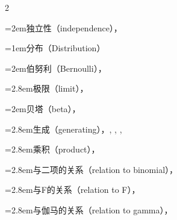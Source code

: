 \begin{multicols}{2}
\par\noindent\hangindent=2em\hspace*{1em}\label{idx:250}独立性（independence），\hyperref[exercise:1.39]{\pageref*{exercise:1.39}}\par
\par\addvspace{2pt}
\par\noindent\hangindent=1em\hspace*{0em}\label{idx:251}分布（Distribution）\par
\par\noindent\hangindent=2em\hspace*{1em}\label{idx:252}伯努利（Bernoulli），\hyperref[eq:3.2.3]{\pageref*{eq:3.2.3}}\par
\par\noindent\hangindent=2.8em\hspace*{1.8em}\label{idx:253}极限（limit），\hyperref[exercise:5.44]{\pageref*{exercise:5.44}}\par
\par\noindent\hangindent=2em\hspace*{1em}\label{idx:254}贝塔（beta），\hyperref[eq:3.3.16]{\pageref*{eq:3.3.16}}\par
\par\noindent\hangindent=2.8em\hspace*{1.8em}\label{idx:255}生成（generating），\hyperref[eq:5.6.5]{\pageref*{eq:5.6.5}}, \hyperref[ex:5.6.7]{\pageref*{ex:5.6.7}}, \hyperref[ex:5.6.9]{\pageref*{ex:5.6.9}}, \hyperref[exercise:5.61]{\pageref*{exercise:5.61}}\par
\par\noindent\hangindent=2.8em\hspace*{1.8em}\label{idx:256}乘积（product），\hyperref[ex:4.3.3]{\pageref*{ex:4.3.3}}\par
\par\noindent\hangindent=2.8em\hspace*{1.8em}\label{idx:257}与二项的关系（relation to binomial），\hyperref[exercise:2.40]{\pageref*{exercise:2.40}}\par
\par\noindent\hangindent=2.8em\hspace*{1.8em}\label{idx:258}与F的关系（relation to F），\hyperref[thm:5.3.8]{\pageref*{thm:5.3.8}}\par
\par\noindent\hangindent=2.8em\hspace*{1.8em}\label{idx:259}与伽马的关系（relation to gamma），\hyperref[exercise:4.24]{\pageref*{exercise:4.24}}\par

\end{multicols}
